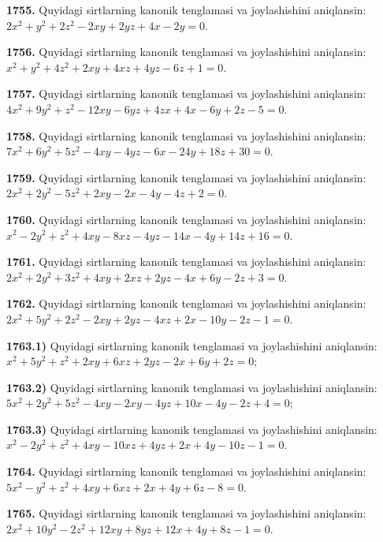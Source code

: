\textbf{1755.} Quyidagi sirtlarning kanonik tenglamasi va joylashishini aniqlansin: $2x^{2} + y^{2} + 2z^{2} - 2xy + 2yz + 4x - 2y = 0$.

\textbf{1756.} Quyidagi sirtlarning kanonik tenglamasi va joylashishini aniqlansin: $x^{2} + y^{2} + 4z^{2} + 2xy + 4xz + 4yz - 6z + 1 = 0$.

\textbf{1757.} Quyidagi sirtlarning kanonik tenglamasi va joylashishini aniqlansin: $4x^{2} + 9y^{2} + z^{2} - 12xy - 6yz + 4zx + 4x - 6y + 2z - 5 = 0$.

\textbf{1758.} Quyidagi sirtlarning kanonik tenglamasi va joylashishini aniqlansin: $7x^{2} + 6y^{2} + 5z^{2} - 4xy - 4yz - 6x - 24y + 18z + 30 = 0$.

\textbf{1759.} Quyidagi sirtlarning kanonik tenglamasi va joylashishini aniqlansin: $2x^{2} + 2y^{2} - 5z^{2} + 2xy - 2x - 4y - 4z + 2 = 0$.

\textbf{1760.} Quyidagi sirtlarning kanonik tenglamasi va joylashishini aniqlansin: $x^{2} - 2y^{2} + z^{2} + 4xy - 8xz - 4yz - 14x - 4y + 14z + 16 = 0$.

\textbf{1761.} Quyidagi sirtlarning kanonik tenglamasi va joylashishini aniqlansin: $2x^{2} + 2y^{2} + 3z^{2} + 4xy + 2xz + 2yz - 4x + 6y - 2z + 3 = 0$.

\textbf{1762.} Quyidagi sirtlarning kanonik tenglamasi va joylashishini aniqlansin: $2x^{2} + 5y^{2} + 2z^{2} - 2xy + 2yz - 4xz + 2x - 10y - 2z - 1 = 0$.

\textbf{1763.1)} Quyidagi sirtlarning kanonik tenglamasi va joylashishini aniqlansin: $x^{2} + 5y^{2} + z^{2} + 2xy + 6xz + 2yz - 2x + 6y + 2z = 0$;

\textbf{1763.2)} Quyidagi sirtlarning kanonik tenglamasi va joylashishini aniqlansin: $5x^{2} + 2y^{2} + 5z^{2} - 4xy - 2xy - 4yz + 10x - 4y - 2z + 4 = 0$;

\textbf{1763.3)} Quyidagi sirtlarning kanonik tenglamasi va joylashishini aniqlansin: $x^{2} - 2y^{2} + z^{2} + 4xy - 10xz + 4yz + 2x + 4y - 10z - 1 = 0$.

\textbf{1764.} Quyidagi sirtlarning kanonik tenglamasi va joylashishini aniqlansin: $5x^{2} - y^{2} + z^{2} + 4xy + 6xz + 2x + 4y + 6z - 8 = 0$.

\textbf{1765.} Quyidagi sirtlarning kanonik tenglamasi va joylashishini aniqlansin: $2x^{2} + 10y^{2} - 2z^{2} + 12xy + 8yz + 12x + 4y + 8z - 1 = 0$.
